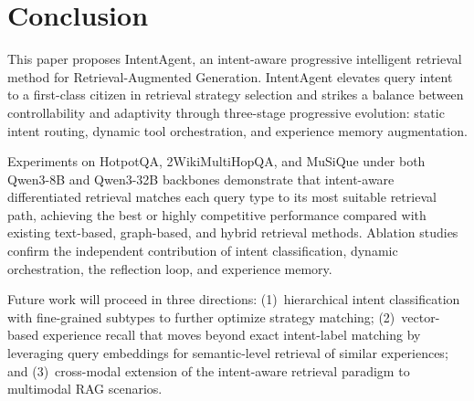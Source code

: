 \documentclass[runningheads]{llncs}
\begin{document}
\section{Conclusion}

This paper proposes IntentAgent, an intent-aware progressive intelligent retrieval method for Retrieval-Augmented Generation. IntentAgent elevates query intent to a first-class citizen in retrieval strategy selection and strikes a balance between controllability and adaptivity through three-stage progressive evolution: static intent routing, dynamic tool orchestration, and experience memory augmentation.

Experiments on HotpotQA, 2WikiMultiHopQA, and MuSiQue under both Qwen3-8B and Qwen3-32B backbones demonstrate that intent-aware differentiated retrieval matches each query type to its most suitable retrieval path, achieving the best or highly competitive performance compared with existing text-based, graph-based, and hybrid retrieval methods. Ablation studies confirm the independent contribution of intent classification, dynamic orchestration, the reflection loop, and experience memory.

Future work will proceed in three directions: (1)~hierarchical intent classification with fine-grained subtypes to further optimize strategy matching; (2)~vector-based experience recall that moves beyond exact intent-label matching by leveraging query embeddings for semantic-level retrieval of similar experiences; and (3)~cross-modal extension of the intent-aware retrieval paradigm to multimodal RAG scenarios.



\end{document}
